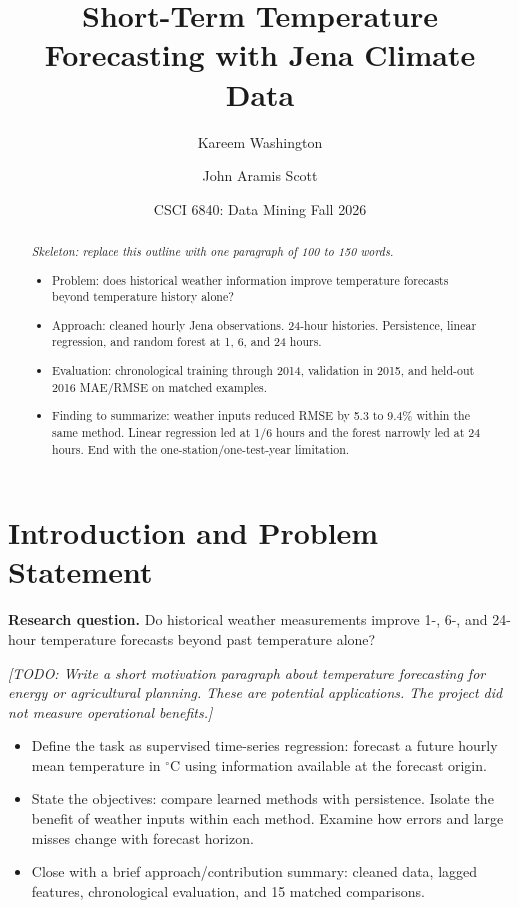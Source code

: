\documentclass[11pt]{article}
\title{Short-Term Temperature Forecasting with Jena Climate Data}
\author{Kareem Washington \and John Aramis Scott}
\date{CSCI 6840: Data Mining \quad Fall 2026}
\newcommand{\todo}[1]{\par\smallskip\noindent
  {\color{blue!60!black}\textit{[TODO: #1]}}\par\smallskip}
\newcommand{\degc}{\ensuremath{{}^{\circ}\mathrm{C}}}
\begin{document}
\maketitle

\begin{abstract}
\noindent\textit{Skeleton: replace this outline with one paragraph of
100 to 150 words.}
\begin{itemize}
  \item Problem: does historical weather information improve temperature
  forecasts beyond temperature history alone?
  \item Approach: cleaned hourly Jena observations. 24-hour histories.
  Persistence, linear regression, and random forest at 1, 6, and 24 hours.
  \item Evaluation: chronological training through 2014, validation in 2015,
  and held-out 2016 MAE/RMSE on matched examples.
  \item Finding to summarize: weather inputs reduced RMSE by 5.3 to 9.4\%
  within the same method. Linear regression led at 1/6 hours and the forest
  narrowly led at 24 hours. End with the one-station/one-test-year limitation.
\end{itemize}
\end{abstract}

\section{Introduction and Problem Statement}
\label{sec:introduction}
\textbf{Research question.} Do historical weather measurements improve
1-, 6-, and 24-hour temperature forecasts beyond past temperature alone?
\todo{Write a short motivation paragraph about temperature forecasting for
energy or agricultural planning. These are potential applications.
The project did not measure operational benefits.}
\begin{itemize}
  \item Define the task as supervised time-series regression: forecast a
  future hourly mean temperature in \degc{} using information available at
  the forecast origin.
  \item State the objectives: compare learned methods with persistence.
  Isolate the benefit of weather inputs within each method. Examine how
  errors and large misses change with forecast horizon.
  \item Close with a brief approach/contribution summary: cleaned data,
  lagged features, chronological evaluation, and 15 matched comparisons.
\end{itemize}
\end{document}
